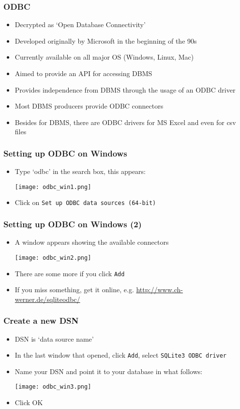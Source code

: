 \documentclass[10pt]{beamer}
\theoremstyle{definition}
\begin{document}
\begin{frame}[fragile]
\frametitle{ODBC}
\begin{itemize}
	\item Decrypted as `Open Database Connectivity'
	\item Developed originally by Microsoft in the beginning of the 90s
	\item Currently available on all major OS (Windows, Linux, Mac)
	\item Aimed to provide an API for accessing DBMS
	\item Provides independence from DBMS through the usage of an ODBC driver
	\item Most DBMS producers provide ODBC connectors
	\item Besides for DBMS, there are ODBC drivers for MS Excel and even for csv files
\end{itemize}
\end{frame}

\begin{frame}[fragile]
\frametitle{Setting up ODBC on Windows}
\begin{itemize}
	\item Type `odbc' in the search box, this appears:
	
	\texttt{[image: odbc\_win1.png]}
	
	\item Click on \texttt{Set up ODBC data sources (64-bit)}
\end{itemize}
\end{frame}

\begin{frame}[fragile]
\frametitle{Setting up ODBC on Windows (2)}
\begin{itemize}
	\item A window appears showing the available connectors
	
	\texttt{[image: odbc\_win2.png]}
	
	\item There are some more if you click \texttt{Add}
	\item If you miss something, get it online, e.g. \url{http://www.ch-werner.de/sqliteodbc/}
\end{itemize}
\end{frame}

\begin{frame}[fragile]
\frametitle{Create a new DSN}
\begin{itemize}
	\item DSN is `data source name'
	\item In the last window that opened, click \texttt{Add}, select \texttt{SQLite3 ODBC driver}
	\item Name your DSN and point it to your database in what follows:
	
	\texttt{[image: odbc\_win3.png]}
	
	\item Click OK
\end{itemize}
\end{frame}
\end{document}
